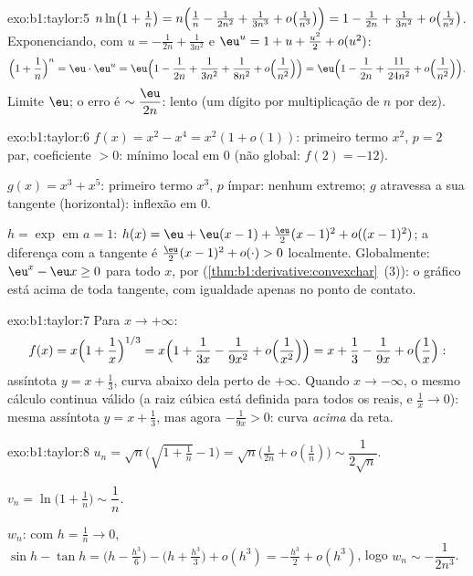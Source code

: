 \begin{solution}{exo:b1:taylor:5}
$n\ln\bigl(1 + \frac1n\bigr) = n\Bigl(\frac1n - \frac{1}{2n^2} +
\frac{1}{3n^3} + o\bigl(\frac{1}{n^3}\bigr)\Bigr) = 1 - \frac{1}{2n}
+ \frac{1}{3n^2} + o\bigl(\frac{1}{n^2}\bigr)$. Exponenciando, com
$u = -\frac{1}{2n} + \frac{1}{3n^2}$ e $\eu^u = 1 + u + \frac{u^2}2
+ o(u^2)$:
\[
\Bigl(1 + \frac1n\Bigr)^n = \eu\cdot \eu^{u}
= \eu\Bigl(1 - \frac{1}{2n} + \frac{1}{3n^2} + \frac{1}{8n^2}
+ o\Bigl(\frac{1}{n^2}\Bigr)\Bigr)
= \eu\Bigl(1 - \frac{1}{2n} + \frac{11}{24n^2} +
o\Bigl(\frac{1}{n^2}\Bigr)\Bigr).
\]
Limite $\eu$; o erro é $\sim \dfrac{\eu}{2n}$: lento (um dígito por multiplicação de
$n$ por dez).
\end{solution}

\begin{solution}{exo:b1:taylor:6}
$f(x) = x^2 - x^4 = x^2(1 + o(1))$: primeiro termo $x^2$, $p = 2$ par,
coeficiente $> 0$: mínimo local em $0$ (não global: $f(2) = -12$).

$g(x) = x^3 + x^5$: primeiro termo $x^3$, $p$ ímpar: nenhum extremo; $g$
atravessa a sua tangente (horizontal): inflexão em $0$.

$h = \exp$ em $a = 1$: $h(x) = \eu + \eu(x-1) + \frac{\eu}{2}(x-1)^2
+ o((x-1)^2)$; a diferença com a tangente é
$\frac{\eu}{2}(x-1)^2 + o(\cdot) > 0$ localmente. Globalmente: $\eu^x -
\eu x \geq 0$ para todo $x$, por 
(\cref{thm:b1:derivative:convexchar}~(3)): o gráfico está acima de toda
tangente, com igualdade apenas no ponto de contato.
\end{solution}

\begin{solution}{exo:b1:taylor:7}
Para $x \to +\infty$:
\[
f(x) = x\Bigl(1 + \frac1x\Bigr)^{1/3}
= x\Bigl(1 + \frac{1}{3x} - \frac{1}{9x^2} +
o\Bigl(\frac{1}{x^2}\Bigr)\Bigr)
= x + \frac13 - \frac{1}{9x} + o\Bigl(\frac1x\Bigr):
\]
assíntota $y = x + \frac13$, curva abaixo dela perto de $+\infty$. Quando $x
\to -\infty$,
o mesmo cálculo continua válido (a raiz cúbica está definida para
todos os reais, e $\frac1x \to 0$): mesma assíntota $y = x +
\frac13$, mas agora $-\frac{1}{9x} > 0$:
curva \emph{acima} da reta.
\end{solution}

\begin{solution}{exo:b1:taylor:8}
$u_n = \sqrt n\bigl(\sqrt{1 + \tfrac1n} - 1\bigr) = \sqrt
n\bigl(\frac{1}{2n} + o(\frac1n)\bigr) \sim \dfrac{1}{2\sqrt n}$.

$v_n = \ln\bigl(1 + \frac1n\bigr) \sim \dfrac 1n$.

$w_n$: com $h = \frac1n \to 0$, $\sin h - \tan h = \bigl(h -
\frac{h^3}{6}\bigr) - \bigl(h + \frac{h^3}{3}\bigr) + o(h^3) =
-\frac{h^3}{2} + o(h^3)$, logo $w_n \sim -\dfrac{1}{2n^3}$.
\end{solution}

